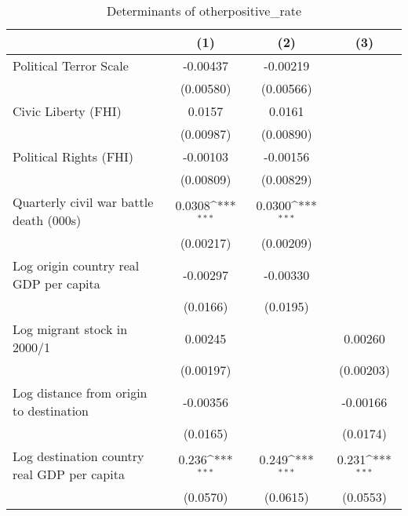 \begin{table}[htbp]\centering
\def\sym#1{\ifmmode^{#1}\else\(^{#1}\)\fi}
\caption{Determinants of otherpositive\_rate}
\begin{tabular}{l*{3}{c}}
\hline\hline
                    &\multicolumn{1}{c}{(1)}         &\multicolumn{1}{c}{(2)}         &\multicolumn{1}{c}{(3)}         \\
\hline
Political Terror Scale&    -0.00437         &    -0.00219         &                     \\
                    &   (0.00580)         &   (0.00566)         &                     \\
[1em]
Civic Liberty (FHI) &      0.0157         &      0.0161         &                     \\
                    &   (0.00987)         &   (0.00890)         &                     \\
[1em]
Political Rights (FHI)&    -0.00103         &    -0.00156         &                     \\
                    &   (0.00809)         &   (0.00829)         &                     \\
[1em]
Quarterly civil war battle death (000s)&      0.0308\sym{***}&      0.0300\sym{***}&                     \\
                    &   (0.00217)         &   (0.00209)         &                     \\
[1em]
Log origin country real GDP per capita&    -0.00297         &    -0.00330         &                     \\
                    &    (0.0166)         &    (0.0195)         &                     \\
[1em]
Log migrant stock in 2000/1&     0.00245         &                     &     0.00260         \\
                    &   (0.00197)         &                     &   (0.00203)         \\
[1em]
Log distance from origin to destination&    -0.00356         &                     &    -0.00166         \\
                    &    (0.0165)         &                     &    (0.0174)         \\
[1em]
Log destination country real GDP per capita&       0.236\sym{***}&       0.249\sym{***}&       0.231\sym{***}\\
                    &    (0.0570)         &    (0.0615)         &    (0.0553)         \\

\end{tabular}
\end{table}

